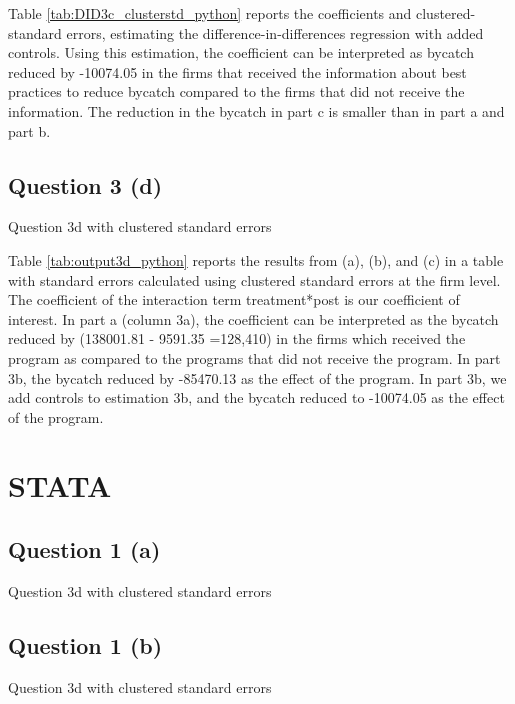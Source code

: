 \documentclass{article}
\begin{document}
Table \ref{tab:DID3c_clusterstd_python} reports the coefficients and clustered-standard errors, estimating the difference-in-differences regression with added controls. Using this estimation, the coefficient can be interpreted as bycatch reduced by  -10074.05 in the firms that received the information about best practices to reduce bycatch compared to the firms that did not receive the information. The reduction in the bycatch in part c is smaller than in part a and part b.

\newpage


\subsection{Question 3 (d)}
\begin{table}[ht]
    \centering
    
    \caption{Question 3d with clustered standard errors }
    \label{tab:output3d_python}
\end{table}

Table \ref{tab:output3d_python} reports the results from (a), (b), and (c) in a table with standard errors calculated using clustered standard errors at the firm level. The coefficient of the interaction term treatment*post is our coefficient of interest. In part a (column 3a), the coefficient can be interpreted as the bycatch reduced by (138001.81 - 9591.35 =128,410) in the firms which received the program as compared to the programs that did not receive the program. In part 3b, the bycatch reduced by -85470.13 as the effect of the program. In part 3b, we add controls to estimation 3b, and the bycatch reduced to -10074.05 as the effect of the program.

\newpage

\section{STATA}

\subsection{Question 1 (a)}
\begin{table}[ht]
    \centering
    
    \caption{Question 3d with clustered standard errors }
    \label{tab:q1a_cluster_stata}
\end{table}

\subsection{Question 1 (b)}
\begin{table}[ht]
    \centering
    
    \caption{Question 3d with clustered standard errors }
    \label{tab:q1b_cluster_stata}
\end{table}
\end{document}
